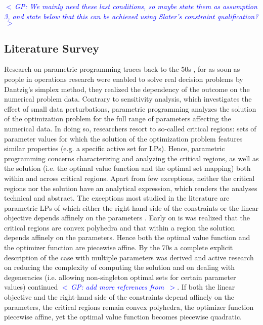 \documentclass{article}
\newcommand{\commentGP}[1]{\noindent \textcolor{blue}{\emph{$<\,$GP: #1$\,>$}}}%
\begin{document}
\commentGP{We mainly need these last conditions, so maybe state them as assumption 3, and state below that this can be achieved using Slater's constraint qualification?}



\subsection{Literature Survey}

Research on parametric programming traces back to the 50s \cite{Saaty_Gass_1954,Gass_Saaty_1955}, for as soon as people in operations research were enabled to solve real decision problems by Dantzig's simplex method, they realized the dependency of the outcome on the numerical problem data. Contrary to sensitivity analysis, which investigates the effect of small data perturbations, parametric programming analyzes the solution of the optimization problem for the full range of parameters affecting the numerical data. In doing so, researchers resort to so-called critical regions: sets of parameter values for which the solution of the optimization problem features similar properties (e.g. a specific active set for LPs). Hence, parametric programming concerns characterizing and analyzing the critical regions, as well as the solution (i.e. the optimal value function and the optimal set mapping) both within and across critical regions. Apart from few exceptions, neither the critical regions nor the solution have an analytical expression, which renders the analyses technical and abstract. The exceptions most studied in the literature are parametric LPs of which either the right-hand side of the constraints or the linear objective depends affinely on the parameters \cite{Gal_1979,Gal_1984}. Early on is was realized that the critical regions are convex polyhedra and that within a region the solution depends affinely on the parameters. Hence both the optimal value function and the optimizer function are piecewise affine. By the 70s a complete explicit description of the case with multiple parameters was derived \cite{Gal_Nedoma_1972} and active research on reducing the complexity of computing the solution and on dealing with degeneracies (i.e. allowing non-singleton optimal sets for certain parameter values) continued \cite{Borrelli_et_al_2003} \commentGP{add more references from \cite{Alessio2009}}. If both the linear objective and the right-hand side of the constraints depend affinely on the parameters, the critical regions remain convex polyhedra, the optimizer function piecewise affine, yet the optimal value function becomes piecewise quadratic.
\end{document}
